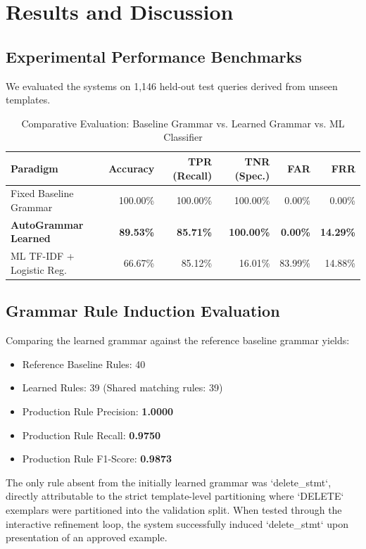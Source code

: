 \documentclass[11pt,a4paper]{article}
\begin{document}
\section{Results and Discussion}

\subsection{Experimental Performance Benchmarks}
We evaluated the systems on 1,146 held-out test queries derived from unseen templates.

\begin{table}[h]
\centering
\caption{Comparative Evaluation: Baseline Grammar vs. Learned Grammar vs. ML Classifier}
\label{tab:comparison}
\begin{tabular}{lrrrrr}
\toprule
\textbf{Paradigm} & \textbf{Accuracy} & \textbf{TPR (Recall)} & \textbf{TNR (Spec.)} & \textbf{FAR} & \textbf{FRR} \\
\midrule
Fixed Baseline Grammar & 100.00\% & 100.00\% & 100.00\% & 0.00\% & 0.00\% \\
\textbf{AutoGrammar Learned} & \textbf{89.53\%} & \textbf{85.71\%} & \textbf{100.00\%} & \textbf{0.00\%} & \textbf{14.29\%} \\
ML TF-IDF + Logistic Reg. & 66.67\% & 85.12\% & 16.01\% & 83.99\% & 14.88\% \\
\bottomrule
\end{tabular}
\end{table}

\subsection{Grammar Rule Induction Evaluation}
Comparing the learned grammar against the reference baseline grammar yields:
\begin{itemize}
    \item Reference Baseline Rules: 40
    \item Learned Rules: 39 (Shared matching rules: 39)
    \item Production Rule Precision: \textbf{1.0000}
    \item Production Rule Recall: \textbf{0.9750}
    \item Production Rule F1-Score: \textbf{0.9873}
\end{itemize}
The only rule absent from the initially learned grammar was `delete_stmt`, directly attributable to the strict template-level partitioning where `DELETE` exemplars were partitioned into the validation split. When tested through the interactive refinement loop, the system successfully induced `delete_stmt` upon presentation of an approved example.
\end{document}
